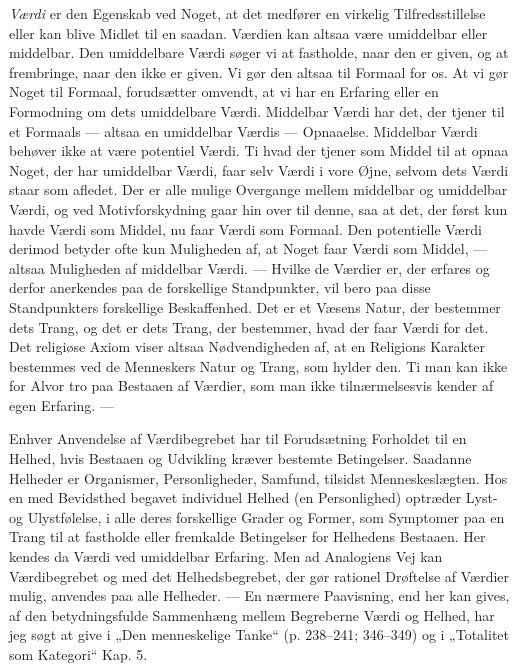 \documentclass[12pt,a4paper,openany]{book}
\newcommand{\opage}[1]{\marginnote{\footnotesize\textit{[#1]}}}
\begin{document}
\textit{Værdi} er den Egenskab ved Noget, at det medfører en virkelig
Tilfredsstillelse eller kan blive Midlet til en saadan. Værdien kan
altsaa være umiddelbar eller middelbar. Den umiddelbare Værdi søger vi
at fastholde, naar den er given, og at frembringe, naar den ikke er
given. Vi gør den altsaa til Formaal for os. At vi gør Noget til
Formaal, forudsætter omvendt, at vi har en Erfaring eller en Formodning
om dets umiddelbare Værdi. Middelbar Værdi har
\opage{11}det, der tjener til et Formaals --- altsaa en umiddelbar
Værdis --- Opnaaelse. Middelbar Værdi behøver ikke at være potentiel
Værdi. Ti hvad der tjener som Middel til at opnaa Noget, der har
umiddelbar Værdi, faar selv Værdi i vore Øjne, selvom dets Værdi staar
som afledet. Der er alle mulige Overgange mellem middelbar og umiddelbar
Værdi, og ved Motivforskydning gaar hin over til denne, saa at det, der
først kun havde Værdi som Middel, nu faar Værdi som Formaal. Den
potentielle Værdi derimod betyder ofte kun Muligheden af, at Noget faar
Værdi som Middel, --- altsaa Muligheden af middelbar Værdi. --- Hvilke
de Værdier er, der erfares og derfor anerkendes paa de forskellige
Standpunkter, vil bero paa disse Standpunkters forskellige Beskaffenhed.
Det er et Væsens Natur, der bestemmer dets Trang, og det er dets Trang,
der bestemmer, hvad der faar Værdi for det. Det religiøse Axiom viser
altsaa Nødvendigheden af, at en Religions Karakter bestemmes ved de
Menneskers Natur og Trang, som hylder den. Ti man kan ikke for Alvor tro
paa Bestaaen af Værdier, som man ikke tilnærmelsesvis kender af egen
Erfaring. ---

Enhver Anvendelse af Værdibegrebet har til Forudsætning Forholdet til en
Helhed, hvis Bestaaen og Udvikling kræver bestemte Betingelser. Saadanne
Helheder er Organismer, Personligheder, Samfund, tilsidst
Menneskeslægten. Hos en med Bevidsthed begavet individuel Helhed (en
Personlighed) optræder Lyst- og Ulystfølelse, i alle deres forskellige
Grader og Former, som Symptomer paa en Trang til at fastholde eller
fremkalde Betingelser for Helhedens Bestaaen. Her kendes da Værdi ved
umiddelbar Erfaring. Men ad Analogiens Vej kan Værdibegrebet og med det
Helhedsbegrebet, der gør rationel Drøftelse af Værdier mulig, anvendes
paa alle Helheder. --- En nærmere Paavisning, end her kan gives, af den
betydningsfulde Sammenhæng mellem Begreberne Værdi og Helhed, har jeg
søgt at give i „Den menneskelige Tanke“ (p. 238--241; 346--349) og i
„Totalitet som Kategori“ Kap. 5.

\opage{12}\mbox{}\clearpage
\end{document}
